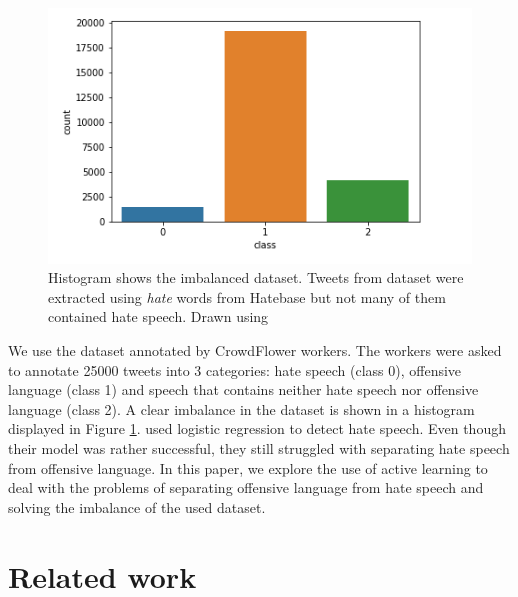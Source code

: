 \documentclass[10pt, a4paper]{article}
\begin{document}
	\begin{figure}[h]
		\includegraphics[width=1.1\linewidth, height=0.25\textheight]{pictures/HistOfData}
		\caption[Histogram showing number of labeled classes]{Histogram shows the imbalanced dataset. Tweets from dataset were extracted using \textit{hate} words from Hatebase but not many of them contained hate speech. Drawn using \citep{Matplotlib,seaborn}}
		\label{fig:histofdata}
	\end{figure}
	
	We use the dataset annotated by CrowdFlower workers. The workers were asked to annotate 25000 tweets into 3 categories: hate speech (class 0), offensive language (class 1) and speech that contains neither hate speech nor offensive language (class 2). A clear imbalance in the dataset is shown in a histogram displayed in Figure \ref{fig:histofdata}.\citet{Davidson2017AutomatedHS} used logistic regression to detect hate speech. Even though their model was rather successful, they still struggled with separating hate speech from offensive language. In this paper, we explore the use of active learning to deal with the problems of separating offensive language from hate speech and solving the imbalance of the used dataset.
	
	
	\section{Related work}
	
\end{document}
